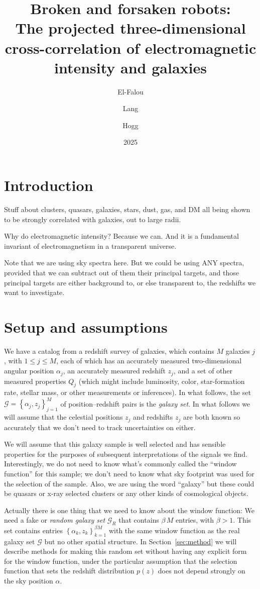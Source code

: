 \documentclass{article}
\title{\bfseries%
Broken and forsaken robots:\\
The projected three-dimensional cross-correlation of electromagnetic intensity and galaxies}
\author{El-Falou \and Lang \and Hogg}
\date{2025}
\newcommand{\sectionname}{Section}
\newcommand{\secref}[1]{\sectionname~\ref{#1}}
\newcommand{\setof}[1]{\left\{{#1}\right\}}
\newcommand{\set}[1]{\mathscr{#1}}
\begin{document}
\maketitle

\section{Introduction}\label{sec:intro}
Stuff about clusters, quasars, galaxies, stars, dust, gas, and DM all being shown to be strongly correlated with galaxies, out to large radii.

Why do electromagnetic intensity? Because we can. And it is a fundamental invariant of electromagnetism in a transparent universe.

Note that we are using sky spectra here. But we could be using ANY spectra, provided that we can subtract out of them their principal targets, and those principal targets are either background to, or else transparent to, the redshifts we want to investigate.

\section{Setup and assumptions}\label{sec:setup}
We have a catalog from a redshift survey of galaxies, which contains $M$ galaxies $j$, with $1\leq j\leq M$, each of which has an accurately measured two-dimensional angular position $\alpha_j$, an accurately measured redshift $z_j$, and a set of other measured properties $Q_j$ (which might include luminosity, color, star-formation rate, stellar mass, or other measurements or inferences).
In what follows, the set $\set{G}=\setof{\alpha_j, z_j}_{j=1}^M$ of position--redshift pairs is the \emph{galaxy set}.
In what follows we will assume that the celestial positions $z_j$ and redshifts $z_j$ are both known so accurately that we don't need to track uncertainties on either.

We will assume that this galaxy sample is well selected and has sensible properties for the purposes of subsequent interpretations of the signals we find.
Interestingly, we do not need to know what's commonly called the ``window function'' for this sample; we don't need to know what sky footprint was used for the selection of the sample.
Also, we are using the word ``galaxy'' but these could be quasars or x-ray selected clusters or any other kinds of cosmological objects.

Actually there is one thing that we need to know about the window function:
We need a fake or \emph{random galaxy set} $\set{G}_R$ that contains $\beta\,M$ entries, with $\beta>1$.
This set contains entries $\setof{\alpha_k,z_k}_{k=1}^{\beta M}$ with the same window function as the real galaxy set $\set{G}$ but no other spatial structure.
In \secref{sec:method} we will describe methods for making this random set without having any explicit form for the window function, under the particular assumption that the selection function that sets the redshift distribution $p(z)$ does not depend strongly on the sky position $\alpha$.
\end{document}
